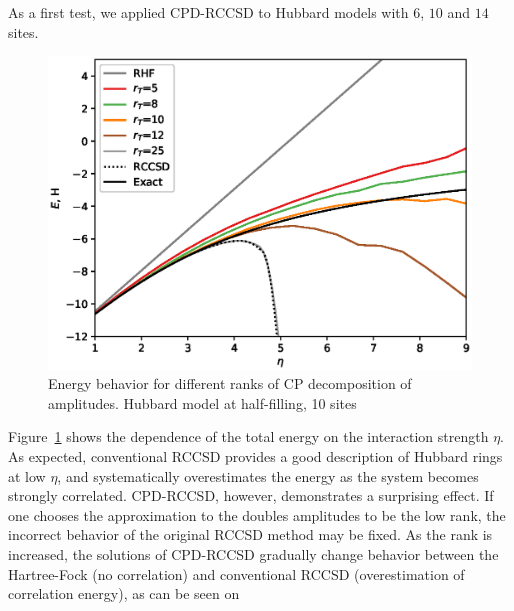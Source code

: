 As a first test, we applied CPD-RCCSD to Hubbard models with $6$, $10$ and $14$ 
sites. 
%
\begin{figure}[ht!]
\centering
\includegraphics[width=\columnwidth]
{figures/tcc_strong_correlation/energy_vs_u_10_sites_cpd_rccsd}
\caption{Energy behavior for different ranks of CP decomposition of amplitudes. 
Hubbard model at half-filling, 10 sites}
\label{fig:energy_vs_u_cpd}
\end{figure}
%
Figure~\ref{fig:energy_vs_u_cpd} shows the dependence of the total energy 
on the interaction strength $\eta$. As expected, conventional RCCSD provides 
a good description of Hubbard rings at low $\eta$, and systematically 
overestimates the energy as the system becomes strongly correlated. CPD-RCCSD, 
however, demonstrates a surprising effect. If one chooses the approximation to 
the doubles amplitudes to be the low 
rank, the incorrect behavior of the original RCCSD method may be fixed. As the 
rank is increased, the solutions of CPD-RCCSD gradually change behavior between 
the Hartree-Fock (no correlation) and conventional RCCSD 
(overestimation of correlation energy), as can be seen on 
